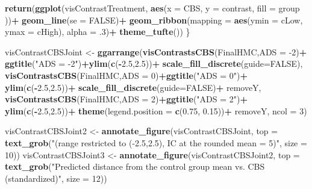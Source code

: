 \documentclass[10pt,dvipsnames,enabledeprecatedfontcommands]{scrartcl}
\newenvironment{Shaded}{\begin{snugshade}}{\end{snugshade}}
\newcommand{\KeywordTok}[1]{\textcolor[rgb]{0.13,0.29,0.53}{\textbf{#1}}}
\newcommand{\DataTypeTok}[1]{\textcolor[rgb]{0.13,0.29,0.53}{#1}}
\newcommand{\DecValTok}[1]{\textcolor[rgb]{0.00,0.00,0.81}{#1}}
\newcommand{\FloatTok}[1]{\textcolor[rgb]{0.00,0.00,0.81}{#1}}
\newcommand{\StringTok}[1]{\textcolor[rgb]{0.31,0.60,0.02}{#1}}
\newcommand{\OtherTok}[1]{\textcolor[rgb]{0.56,0.35,0.01}{#1}}
\newcommand{\OperatorTok}[1]{\textcolor[rgb]{0.81,0.36,0.00}{\textbf{#1}}}
\newcommand{\NormalTok}[1]{#1}
\begin{document}
\begin{Shaded}
\begin{Highlighting}[]
  \KeywordTok{return}\NormalTok{(}\KeywordTok{ggplot}\NormalTok{(visContrastTreatment, }\KeywordTok{aes}\NormalTok{(}\DataTypeTok{x =}\NormalTok{ CBS, }\DataTypeTok{y =}\NormalTok{ contrast, }\DataTypeTok{fill =}\NormalTok{ group ))}\OperatorTok{+}
\StringTok{           }\KeywordTok{geom_line}\NormalTok{(}\DataTypeTok{se =} \OtherTok{FALSE}\NormalTok{)}\OperatorTok{+}
\StringTok{            }\KeywordTok{geom_ribbon}\NormalTok{(}\DataTypeTok{mapping =} 
        \KeywordTok{aes}\NormalTok{(}\DataTypeTok{ymin =}\NormalTok{ cLow, }\DataTypeTok{ymax =}\NormalTok{ cHigh),  }
         \DataTypeTok{alpha =} \FloatTok{.3}\NormalTok{)}\OperatorTok{+}
\StringTok{          }\KeywordTok{theme_tufte}\NormalTok{())}
\NormalTok{\}}


\NormalTok{visContrastCBSJoint <-}\StringTok{ }\KeywordTok{ggarrange}\NormalTok{(}\KeywordTok{visContrastsCBS}\NormalTok{(FinalHMC,}\DataTypeTok{ADS =} \DecValTok{-2}\NormalTok{)}\OperatorTok{+}
\StringTok{      }\KeywordTok{ggtitle}\NormalTok{(}\StringTok{"ADS = -2"}\NormalTok{)}\OperatorTok{+}\KeywordTok{ylim}\NormalTok{(}\KeywordTok{c}\NormalTok{(}\OperatorTok{-}\FloatTok{2.5}\NormalTok{,}\FloatTok{2.5}\NormalTok{))}\OperatorTok{+}\StringTok{ }\KeywordTok{scale_fill_discrete}\NormalTok{(}\DataTypeTok{guide=}\OtherTok{FALSE}\NormalTok{),}
          \KeywordTok{visContrastsCBS}\NormalTok{(FinalHMC,}\DataTypeTok{ADS =} \DecValTok{0}\NormalTok{)}\OperatorTok{+}\KeywordTok{ggtitle}\NormalTok{(}\StringTok{"ADS = 0"}\NormalTok{)}\OperatorTok{+}
\StringTok{        }\KeywordTok{ylim}\NormalTok{(}\KeywordTok{c}\NormalTok{(}\OperatorTok{-}\FloatTok{2.5}\NormalTok{,}\FloatTok{2.5}\NormalTok{))}\OperatorTok{+}\StringTok{ }\KeywordTok{scale_fill_discrete}\NormalTok{(}\DataTypeTok{guide=}\OtherTok{FALSE}\NormalTok{)}\OperatorTok{+}
\StringTok{        }\NormalTok{removeY,}
        \KeywordTok{visContrastsCBS}\NormalTok{(FinalHMC,}\DataTypeTok{ADS =} \DecValTok{2}\NormalTok{)}\OperatorTok{+}\KeywordTok{ggtitle}\NormalTok{(}\StringTok{"ADS = 2"}\NormalTok{)}\OperatorTok{+}
\StringTok{        }\KeywordTok{ylim}\NormalTok{(}\KeywordTok{c}\NormalTok{(}\OperatorTok{-}\FloatTok{2.5}\NormalTok{,}\FloatTok{2.5}\NormalTok{))}\OperatorTok{+}\StringTok{ }\KeywordTok{theme}\NormalTok{(}\DataTypeTok{legend.position =} \KeywordTok{c}\NormalTok{(}\FloatTok{0.75}\NormalTok{, }\FloatTok{0.15}\NormalTok{))}\OperatorTok{+}
\StringTok{        }\NormalTok{removeY, }\DataTypeTok{ncol =} \DecValTok{3}\NormalTok{)}

\NormalTok{visContrastCBSJoint2 <-}\StringTok{ }\KeywordTok{annotate_figure}\NormalTok{(visContrastCBSJoint, }
      \DataTypeTok{top =} \KeywordTok{text_grob}\NormalTok{(}\StringTok{"(range restricted to (-2.5,2.5), IC at the rounded mean = 5)"}\NormalTok{,}
                                \DataTypeTok{size =} \DecValTok{10}\NormalTok{))}
\NormalTok{visContrastCBSJoint3 <-}\StringTok{ }\KeywordTok{annotate_figure}\NormalTok{(visContrastCBSJoint2, }
\DataTypeTok{top =} \KeywordTok{text_grob}\NormalTok{(}\StringTok{"Predicted distance from the control group mean vs. CBS  (standardized)"}\NormalTok{,}
                                \DataTypeTok{size =} \DecValTok{12}\NormalTok{))}


\end{Highlighting}
\end{Shaded}
\end{document}
